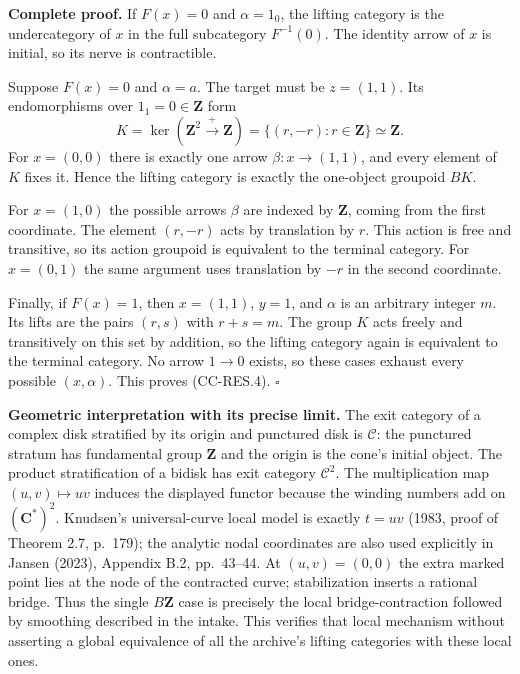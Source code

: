 \textbf{Complete proof.} If \(F(x)=0\) and \(\alpha=1_0\), the lifting
category is the undercategory of \(x\) in the full subcategory
\(F^{-1}(0)\). The identity arrow of \(x\) is initial, so its nerve is
contractible.

Suppose \(F(x)=0\) and \(\alpha=a\). The target must be \(z=(1,1)\). Its
endomorphisms over \(1_1=0\in\mathbf Z\) form \[
K=\ker(\mathbf Z^2\xrightarrow{+}\mathbf Z)
 =\{(r,-r):r\in\mathbf Z\}\simeq\mathbf Z.
\] For \(x=(0,0)\) there is exactly one arrow \(\beta:x\to(1,1)\), and
every element of \(K\) fixes it. Hence the lifting category is exactly
the one-object groupoid \(BK\).

For \(x=(1,0)\) the possible arrows \(\beta\) are indexed by
\(\mathbf Z\), coming from the first coordinate. The element \((r,-r)\)
acts by translation by \(r\). This action is free and transitive, so its
action groupoid is equivalent to the terminal category. For \(x=(0,1)\)
the same argument uses translation by \(-r\) in the second coordinate.

Finally, if \(F(x)=1\), then \(x=(1,1)\), \(y=1\), and \(\alpha\) is an
arbitrary integer \(m\). Its lifts are the pairs \((r,s)\) with
\(r+s=m\). The group \(K\) acts freely and transitively on this set by
addition, so the lifting category again is equivalent to the terminal
category. No arrow \(1\to0\) exists, so these cases exhaust every
possible \((x,\alpha)\). This proves (CC-RES.4). \(\square\)

\textbf{Geometric interpretation with its precise limit.} The exit
category of a complex disk stratified by its origin and punctured disk
is \(\mathcal C\): the punctured stratum has fundamental group
\(\mathbf Z\) and the origin is the cone's initial object. The product
stratification of a bidisk has exit category \(\mathcal C^2\). The
multiplication map \((u,v)\mapsto uv\) induces the displayed functor
because the winding numbers add on \((\mathbf C^*)^2\). Knudsen's
universal-curve local model is exactly \(t=uv\) (1983, proof of Theorem
2.7, p.~179); the analytic nodal coordinates are also used explicitly in
Jansen (2023), Appendix B.2, pp.~43--44. At \((u,v)=(0,0)\) the extra
marked point lies at the node of the contracted curve; stabilization
inserts a rational bridge. Thus the single \(B\mathbf Z\) case is
precisely the local bridge-contraction followed by smoothing described
in the intake. This verifies that local mechanism without asserting a
global equivalence of all the archive's lifting categories with these
local ones.

